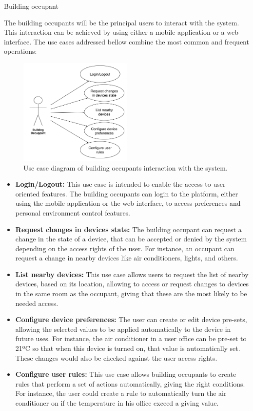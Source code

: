 \begin{Paragraph}{Building occupant}
	
The building occupants will be the principal users to interact with the system. This interaction can be achieved by using either a mobile application or a web interface. The use cases addressed bellow combine the most common and frequent operations:


\begin{figure}[H]
	\centering
	\includegraphics[width=0.5\textwidth]{figures/usecase1.png}
	\caption{Use case diagram of building occupants interaction with the system.}
	\label{fig:user}
\end{figure}

\begin{itemize}

	\item{\textbf{Login/Logout:}	This use case is intended to enable the access to user oriented features. The building occupants can login to the platform, either using the mobile application or the web interface, to access preferences and personal environment control features.}
	\item{\textbf{Request changes in devices state:}	The building occupant can request a change in the state of a device, that can be accepted or denied by the system depending on the access rights of the user. For instance, an occupant can request a change in nearby devices like air conditioners, lights, and others.}
	\item{\textbf{List nearby devices:}	This use case allows users to request the list of nearby devices, based on its location, allowing to access or request changes to devices in the same room as the occupant, giving that these are the most likely to be needed access.}
	\item{\textbf{Configure device preferences:}	The user can create or edit device pre-sets, allowing the selected values to be applied automatically to the device in future uses. For instance, the air conditioner in a user office can be pre-set to 21ºC so that when this device is turned on, that value is automatically set. These changes would also be checked against the user access rights.}
	\item{\textbf{Configure user rules:}	This use case allows building occupants to create rules that perform a set of actions automatically, giving the right conditions. For instance, the user could create a rule to automatically turn the air conditioner on if the temperature in his office exceed a giving value.} 


\end{itemize}
\end{Paragraph}

